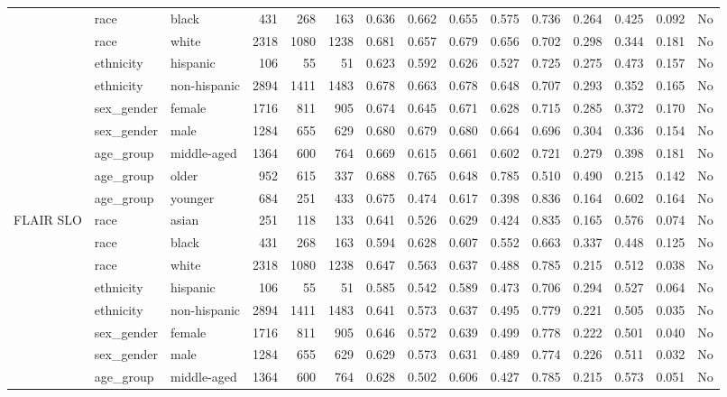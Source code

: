 \begin{longtable}{@{}lllrrrrrrrrrrrr@{}}
 & race & black & 431 & 268 & 163 & 0.636 & 0.662 & 0.655 & 0.575 & 0.736 & 0.264 & 0.425 & 0.092 & No \\
 & race & white & 2318 & 1080 & 1238 & 0.681 & 0.657 & 0.679 & 0.656 & 0.702 & 0.298 & 0.344 & 0.181 & No \\
 & ethnicity & hispanic & 106 & 55 & 51 & 0.623 & 0.592 & 0.626 & 0.527 & 0.725 & 0.275 & 0.473 & 0.157 & No \\
 & ethnicity & non-hispanic & 2894 & 1411 & 1483 & 0.678 & 0.663 & 0.678 & 0.648 & 0.707 & 0.293 & 0.352 & 0.165 & No \\
 & sex\_gender & female & 1716 & 811 & 905 & 0.674 & 0.645 & 0.671 & 0.628 & 0.715 & 0.285 & 0.372 & 0.170 & No \\
 & sex\_gender & male & 1284 & 655 & 629 & 0.680 & 0.679 & 0.680 & 0.664 & 0.696 & 0.304 & 0.336 & 0.154 & No \\
 & age\_group & middle-aged & 1364 & 600 & 764 & 0.669 & 0.615 & 0.661 & 0.602 & 0.721 & 0.279 & 0.398 & 0.181 & No \\
 & age\_group & older & 952 & 615 & 337 & 0.688 & 0.765 & 0.648 & 0.785 & 0.510 & 0.490 & 0.215 & 0.142 & No \\
 & age\_group & younger & 684 & 251 & 433 & 0.675 & 0.474 & 0.617 & 0.398 & 0.836 & 0.164 & 0.602 & 0.164 & No \\
FLAIR SLO & race & asian & 251 & 118 & 133 & 0.641 & 0.526 & 0.629 & 0.424 & 0.835 & 0.165 & 0.576 & 0.074 & No \\
 & race & black & 431 & 268 & 163 & 0.594 & 0.628 & 0.607 & 0.552 & 0.663 & 0.337 & 0.448 & 0.125 & No \\
 & race & white & 2318 & 1080 & 1238 & 0.647 & 0.563 & 0.637 & 0.488 & 0.785 & 0.215 & 0.512 & 0.038 & No \\
 & ethnicity & hispanic & 106 & 55 & 51 & 0.585 & 0.542 & 0.589 & 0.473 & 0.706 & 0.294 & 0.527 & 0.064 & No \\
 & ethnicity & non-hispanic & 2894 & 1411 & 1483 & 0.641 & 0.573 & 0.637 & 0.495 & 0.779 & 0.221 & 0.505 & 0.035 & No \\
 & sex\_gender & female & 1716 & 811 & 905 & 0.646 & 0.572 & 0.639 & 0.499 & 0.778 & 0.222 & 0.501 & 0.040 & No \\
 & sex\_gender & male & 1284 & 655 & 629 & 0.629 & 0.573 & 0.631 & 0.489 & 0.774 & 0.226 & 0.511 & 0.032 & No \\
 & age\_group & middle-aged & 1364 & 600 & 764 & 0.628 & 0.502 & 0.606 & 0.427 & 0.785 & 0.215 & 0.573 & 0.051 & No \\

\end{longtable}
